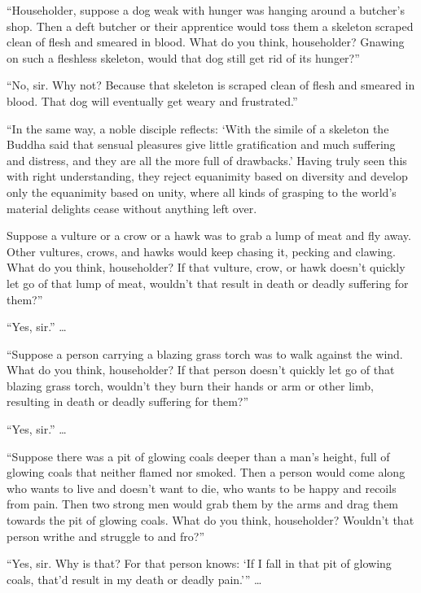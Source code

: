 \documentclass[12pt,openany]{book}%
\begin{document}
“Householder, suppose a dog weak with hunger was hanging around a butcher’s shop. Then a deft butcher or their apprentice would toss them a skeleton scraped clean of flesh and smeared in blood. What do you think, householder? Gnawing on such a fleshless skeleton, would that dog still get rid of its hunger?” 

“No, sir. Why not? Because that skeleton is scraped clean of flesh and smeared in blood. That dog will eventually get weary and frustrated.” 

“In the same way, a noble disciple reflects: ‘With the simile of a skeleton the Buddha said that sensual pleasures give little gratification and much suffering and distress, and they are all the more full of drawbacks.’ Having truly seen this with right understanding, they reject equanimity based on diversity and develop only the equanimity based on unity, where all kinds of grasping to the world’s material delights cease without anything left over. 

Suppose a vulture or a crow or a hawk was to grab a lump of meat and fly away. Other vultures, crows, and hawks would keep chasing it, pecking and clawing. What do you think, householder? If that vulture, crow, or hawk doesn’t quickly let go of that lump of meat, wouldn’t that result in death or deadly suffering for them?” 

“Yes, sir.” … 

“Suppose a person carrying a blazing grass torch was to walk against the wind. What do you think, householder? If that person doesn’t quickly let go of that blazing grass torch, wouldn’t they burn their hands or arm or other limb, resulting in death or deadly suffering for them?” 

“Yes, sir.” … 

“Suppose there was a pit of glowing coals deeper than a man’s height, full of glowing coals that neither flamed nor smoked. Then a person would come along who wants to live and doesn’t want to die, who wants to be happy and recoils from pain. Then two strong men would grab them by the arms and drag them towards the pit of glowing coals. What do you think, householder? Wouldn’t that person writhe and struggle to and fro?” 

“Yes, sir. Why is that? For that person knows: ‘If I fall in that pit of glowing coals, that’d result in my death or deadly pain.’” … 
\end{document}
